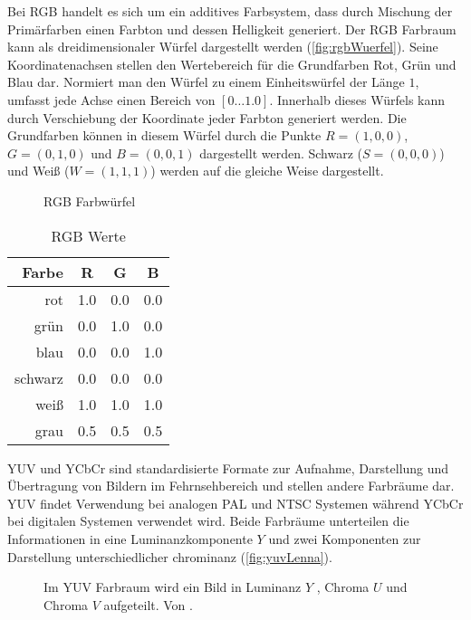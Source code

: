 Bei RGB handelt es sich um ein additives Farbsystem, dass durch Mischung der Primärfarben einen Farbton und dessen
 Helligkeit generiert. Der RGB Farbraum kann als dreidimensionaler Würfel dargestellt werden
 (\autoref{fig:rgbWuerfel}). Seine Koordinatenachsen stellen den Wertebereich für die Grundfarben Rot, Grün und Blau
 dar. Normiert man den Würfel zu einem Einheitswürfel der Länge $1$, umfasst jede Achse einen Bereich von
 \(\left[0 \dotsc 1.0\right]\). Innerhalb dieses Würfels kann durch Verschiebung der Koordinate jeder Farbton generiert
 werden. Die Grundfarben können in diesem Würfel durch die Punkte $R = \left(1,0,0\right)$, $G = \left(0,1,0\right)$
 und $B = \left(0,0,1\right)$ dargestellt werden. Schwarz ($S = \left(0,0,0\right)$) und Weiß
 ($W = \left(1,1,1\right)$) werden auf die gleiche Weise dargestellt.

\begin{figure}[!ht]
	\centering
	\def\svgwidth{.2\columnwidth}
	
	\caption{RGB Farbwürfel}
	\label{fig:rgbWuerfel}
\end{figure}

\begin{table}[!ht]
	\begin{center}
	\begin{tabular}[]{r|c|c|c}
	Farbe & R & G & B \\ \hline\hline
	rot & 1.0 & 0.0 & 0.0 \\
	grün & 0.0 & 1.0 & 0.0 \\
	blau & 0.0 & 0.0 & 1.0 \\
	schwarz & 0.0 & 0.0 & 0.0 \\
	weiß & 1.0 & 1.0 & 1.0 \\
	grau & 0.5 & 0.5 & 0.5 \\
	\end{tabular}
	\caption{RGB Werte}
 	\label{tbl:rgbwerte}
	\end{center}
\end{table}

YUV und YCbCr sind standardisierte Formate zur Aufnahme, Darstellung und Übertragung von Bildern im Fehrnsehbereich und
stellen andere Farbräume dar. YUV findet Verwendung bei analogen PAL und NTSC Systemen während YCbCr bei digitalen
Systemen verwendet wird. Beide Farbräume unterteilen die Informationen in eine Luminanzkomponente $Y$ und zwei
Komponenten zur Darstellung unterschiedlicher \gls{chrominanz} (\autoref{fig:yuvLenna}).

\begin{figure}[!ht]
	\centering
	\caption{Im YUV Farbraum wird ein Bild  in Luminanz $Y$ ,
		Chroma $U$  und Chroma $V$  aufgeteilt. Von
		 \cite{lenna}.
	}
	\label{fig:yuvLenna}
\end{figure}

